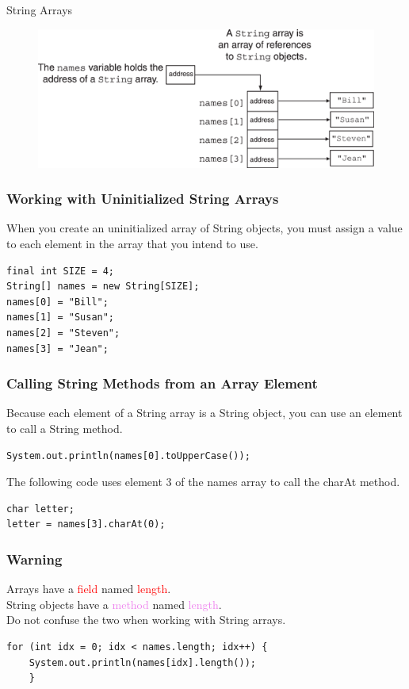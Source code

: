 \documentclass[11pt]{beamer}
\newcommand{\red}[1]{\textcolor{red}{#1}}
\newcommand{\violet}[1]{\textcolor{violet}{#1}}
\begin{document}
\begin{frame}
{String Arrays}
    \noindent 
    \begin{figure}[H]
    \centering
    \includegraphics[scale=0.8]{Images/chapter07_section06_fig14.png}
    \end{figure}    
\end{frame}

\begin{frame}[fragile]
    \frametitle{Working with Uninitialized String Arrays}
    When you create an uninitialized array of String objects, you must assign a value to each element in the array that you intend to use.
    \begin{lstlisting}
final int SIZE = 4;
String[] names = new String[SIZE];
names[0] = "Bill";
names[1] = "Susan";
names[2] = "Steven";
names[3] = "Jean";
    \end{lstlisting}
\end{frame}

\begin{frame}[fragile]
    \frametitle{Calling String Methods from an Array Element}
    Because each element of a String array is a String object, you can use an element to call a String method.
    \begin{lstlisting}
System.out.println(names[0].toUpperCase());
    \end{lstlisting}
    The following code uses element 3 of the names array to call the charAt method.
    \begin{lstlisting}
char letter;
letter = names[3].charAt(0);
    \end{lstlisting}
\end{frame}

\begin{frame}[fragile]
    \frametitle{Warning}
    Arrays have a \red{field} named \red{length}. \\ \vspace{1em}
    String objects have a \violet{method} named \violet{length}. \\ \vspace{1em}
    Do not confuse the two when working with String arrays.
    \begin{lstlisting}
for (int idx = 0; idx < names.length; idx++) {
    System.out.println(names[idx].length());
    }
    \end{lstlisting}
\end{frame}
\end{document}
